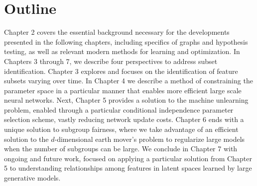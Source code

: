 \section{Outline}
Chapter 2 covers the essential background necessary for the developments presented in the following chapters, including specifics of graphs and hypothesis testing, as well as relevant modern methods for learning and optimization.
In Chapters 3 through 7, we describe four perspectives to address subset identification.
Chapter 3 explores and focuses on the identification of feature subsets varying over time.
In Chapter 4 we describe a method of constraining the parameter space in a particular manner
that enables more efficient large scale neural networks.
Next, Chapter 5 provides a solution to the machine unlearning problem,
enabled through a particular conditional independence parameter selection scheme, vastly reducing network update costs.
Chapter 6 ends with a unique solution to subgroup fairness, 
where we take advantage of an efficient solution to
the $d$-dimensional earth mover's problem
to regularize large models when the number of subgroups can be large.
We conclude in Chapter 7 with ongoing and future work, 
focused on applying a particular solution from Chapter 5
to understanding relationships among features
in latent spaces learned by large generative models.




